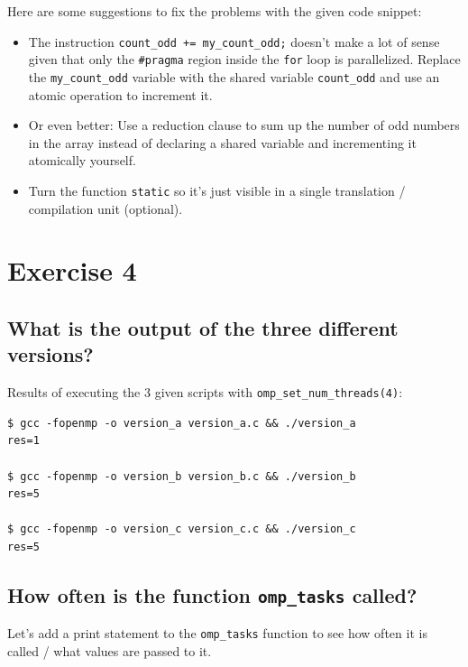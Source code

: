 \documentclass[a4paper,%
7pt,%
DIV12,
headsepline,%
headings=normal,
]{scrartcl}
\begin{document}
Here are some suggestions to fix the problems with the given code snippet:

\begin{itemize}
    \item The instruction \texttt{count\_odd += my\_count\_odd;} doesn't make a lot of sense given that only the \texttt{\#pragma} region inside the \texttt{for} loop is parallelized. Replace the \texttt{my\_count\_odd} variable with the shared variable \texttt{count\_odd} and use an atomic operation to increment it. 

    \item Or even better: Use a reduction clause to sum up the number of odd numbers in the array instead of declaring a shared variable and incrementing it atomically yourself.
    
    \item Turn the function \texttt{static} so it's just visible in a single translation / compilation unit (optional).
\end{itemize}



\section{Exercise 4}

\subsection{What is the output of the three different versions?}

Results of executing the 3 given scripts with \texttt{omp\_set\_num\_threads(4)}:

\begin{lstlisting}
$ gcc -fopenmp -o version_a version_a.c && ./version_a
res=1

$ gcc -fopenmp -o version_b version_b.c && ./version_b
res=5

$ gcc -fopenmp -o version_c version_c.c && ./version_c
res=5
\end{lstlisting}

\subsection{How often is the function \texttt{omp\_tasks} called?}

Let's add a print statement to the \texttt{omp\_tasks} function to see how often it is called / what values are passed to it.
\end{document}
